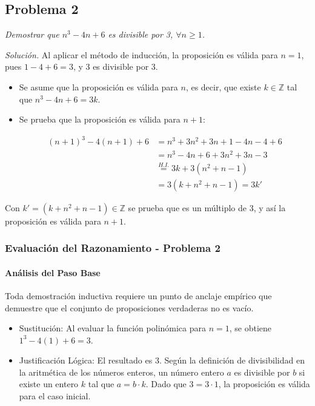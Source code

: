 \documentclass{article}
\begin{document}
\bigskip

\subsection{Problema 2}
\label{sec:problema-2}

\textit{Demostrar que $n^3 - 4n + 6$  es divisible por 3, $\forall n \ge 1$.}

\bigskip

\noindent \textit{Solución.} Al aplicar el método de inducción, la proposición es válida para $n = 1$, pues $1 - 4 + 6 = 3$, y 3 es divisible por 3.

\begin{itemize}
    \item Se asume que la proposición es válida para $n$, es decir, que existe $k \in \mathbb{Z}$ tal que $n^{3} - 4n + 6 = 3k$.
    \item Se prueba que la proposición es válida para $n + 1$:

    \begin{align*}
        (n+1)^{3} - 4(n+1) + 6 &= n^{3} + 3n^{2} + 3n + 1 - 4n - 4 + 6 \\
                                &= n^{3} - 4n + 6 + 3n^{2} + 3n - 3 \\
                                &\stackrel{H.I.}{=} 3k + 3(n^{2} + n - 1) \\
                                &= 3(k + n^{2} + n - 1) = 3k'
    \end{align*}
\end{itemize}

\noindent Con $k' = (k + n^{2} + n - 1) \in \mathbb{Z}$ se prueba que es un múltiplo de 3, y así la proposición es válida para $n + 1$.

\subsubsection{Evaluación del Razonamiento - Problema 2}
\label{sec:evaluacion-2}

\paragraph{Análisis del Paso Base}
Toda demostración inductiva requiere un punto de anclaje empírico que demuestre que el conjunto de proposiciones verdaderas no es vacío.
\begin{itemize}
    \item Sustitución: Al evaluar la función polinómica para $n=1$, se obtiene $1^3 - 4(1) + 6 = 3$.
    \item Justificación Lógica: El resultado es $3$. Según la definición de divisibilidad en la aritmética de los números enteros, un número entero $a$ es divisible por $b$ si existe un entero $k$ tal que $a = b \cdot k$. Dado que $3 = 3 \cdot 1$, la proposición es válida para el caso inicial.
\end{itemize}
\end{document}
